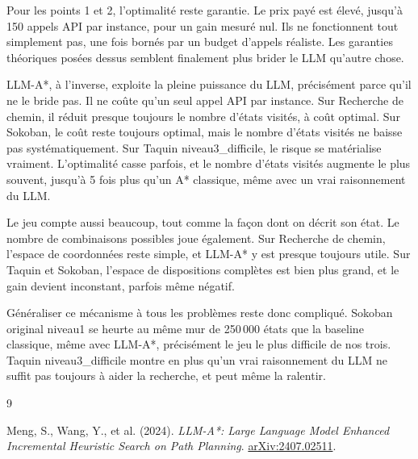 \documentclass[11pt,a4paper]{article}
\begin{document}
Pour les points 1 et 2, l'optimalité reste garantie. Le prix payé est
élevé, jusqu'à 150 appels API par instance, pour un gain mesuré nul.
Ils ne fonctionnent tout simplement pas, une fois bornés par un budget
d'appels réaliste. Les garanties théoriques posées dessus semblent
finalement plus brider le LLM qu'autre chose.

LLM-A*, à l'inverse, exploite la pleine puissance du LLM, précisément
parce qu'il ne le bride pas. Il ne coûte qu'un seul appel API par
instance. Sur Recherche de chemin, il réduit presque toujours le nombre
d'états visités, à coût optimal. Sur Sokoban, le coût reste toujours
optimal, mais le nombre d'états visités ne baisse pas systématiquement.
Sur Taquin niveau3\_difficile, le risque se matérialise vraiment.
L'optimalité casse parfois, et le nombre d'états visités augmente le
plus souvent, jusqu'à 5 fois plus qu'un A* classique, même avec un vrai
raisonnement du LLM.

Le jeu compte aussi beaucoup, tout comme la façon dont on décrit son
état. Le nombre de combinaisons possibles joue également. Sur Recherche
de chemin, l'espace de coordonnées reste simple, et LLM-A* y est
presque toujours utile. Sur Taquin et Sokoban, l'espace de dispositions
complètes est bien plus grand, et le gain devient inconstant, parfois
même négatif.

Généraliser ce mécanisme à tous les problèmes reste donc compliqué.
Sokoban original niveau1 se heurte au même mur de 250\,000 états que la
baseline classique, même avec LLM-A*, précisément le jeu le plus
difficile de nos trois. Taquin niveau3\_difficile montre en plus qu'un
vrai raisonnement du LLM ne suffit pas toujours à aider la recherche,
et peut même la ralentir.

\begin{thebibliography}{9}

Meng, S., Wang, Y., et al. (2024).
\emph{LLM-A*: Large Language Model Enhanced Incremental Heuristic Search on Path Planning}.
\href{https://arxiv.org/abs/2407.02511}{arXiv:2407.02511}.

\end{thebibliography}
\end{document}

